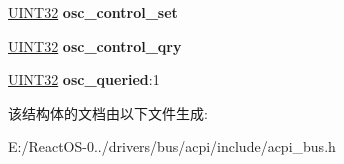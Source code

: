 \begin{DoxyCompactItemize}
\item 
\mbox{\label{structacpi__pci__root_a7e0ebeeb826e55854064f8c0a103f478}} 
\hyperlink{_processor_bind_8h_ae1e6edbbc26d6fbc71a90190d0266018}{U\+I\+N\+T32} {\bfseries osc\+\_\+control\+\_\+set}
\item 
\mbox{\label{structacpi__pci__root_a93429d1c6727c7c589c977a5c3c18148}} 
\hyperlink{_processor_bind_8h_ae1e6edbbc26d6fbc71a90190d0266018}{U\+I\+N\+T32} {\bfseries osc\+\_\+control\+\_\+qry}
\item 
\mbox{\label{structacpi__pci__root_a55fdbbbb9bd42452ddd71c63c0978ac9}} 
\hyperlink{_processor_bind_8h_ae1e6edbbc26d6fbc71a90190d0266018}{U\+I\+N\+T32} {\bfseries osc\+\_\+queried}\+:1
\end{DoxyCompactItemize}


该结构体的文档由以下文件生成\+:\begin{DoxyCompactItemize}
\item 
E\+:/\+React\+O\+S-\/0../drivers/bus/acpi/include/acpi\+\_\+bus.\+h\end{DoxyCompactItemize}
